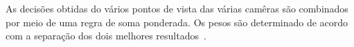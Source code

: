 As decisões obtidas do vários pontos de vista das várias camêras são combinados por meio de uma regra de soma ponderada. Os pesos são determinado de acordo com a separação dos dois melhores resultados~\cite{chil}.













































